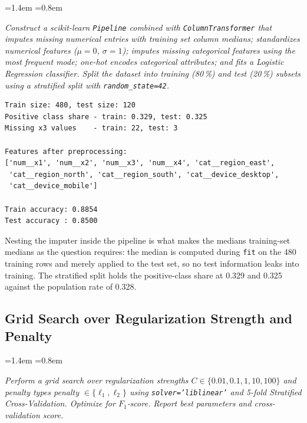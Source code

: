 \documentclass[12pt,a4paper]{article}
\newcommand{\qtext}[1]{%
  \begin{list}{}{\leftmargin=1.4em \rightmargin=0.8em
                 \topsep=3pt \parsep=0pt \itemsep=0pt}
  \item[]\itshape #1
  \end{list}}
\begin{document}
\qtext{Construct a scikit-learn \texttt{Pipeline} combined with \texttt{ColumnTransformer} that
imputes missing numerical entries with training set column medians; standardizes numerical
features ($\mu = 0$, $\sigma = 1$); imputes missing categorical features using the most frequent
mode; one-hot encodes categorical attributes; and fits a Logistic Regression classifier. Split the
dataset into training (80\,\%) and test (20\,\%) subsets using a stratified split with
\texttt{random\_state=42}.}



\begin{lstlisting}[style=plainout]
Train size: 480, test size: 120
Positive class share - train: 0.329, test: 0.325
Missing x3 values    - train: 22, test: 3

Features after preprocessing:
['num__x1', 'num__x2', 'num__x3', 'num__x4', 'cat__region_east',
 'cat__region_north', 'cat__region_south', 'cat__device_desktop',
 'cat__device_mobile']

Train accuracy: 0.8854
Test accuracy : 0.8500
\end{lstlisting}

Nesting the imputer inside the pipeline is what makes the medians training-set medians as the
question requires: the median is computed during \texttt{fit} on the 480 training rows and merely
applied to the test set, so no test information leaks into training. The stratified split holds
the positive-class share at 0.329 and 0.325 against the population rate of 0.328.

\subsection{Grid Search over Regularization Strength and Penalty}

\qtext{Perform a grid search over regularization strengths $C \in \{0.01, 0.1, 1, 10, 100\}$ and
penalty types penalty $\in \{\ell_1, \ell_2\}$ using \texttt{solver='liblinear'} and 5-fold
Stratified Cross-Validation. Optimize for $F_1$-score. Report best parameters and cross-validation
score.}


\end{document}
